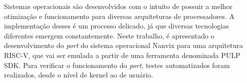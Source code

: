 \begin{resumo}
    Sistemas operacionais são desenvolvidos com o intuito de possuir a melhor otimização e funcionamento para diversas arquiteturas de processadores. A implementação desses é um processo delicado, já que diversas tecnologias diferentes emergem constantemente. Neste trabalho, é apresentado o desenvolvimento do \textit{port} do sistema operacional Nanvix para uma arquitetura RISC-V, que vai ser emulada a partir de uma ferramenta denominada PULP SDK. Para verificar o funcionamento do \textit{port}, testes automatizados foram realizados, desde o nível de kernel ao de usuário.
\end{resumo}
